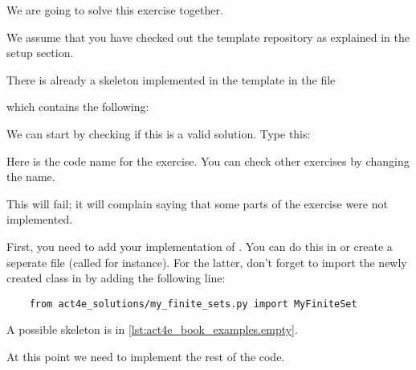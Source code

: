 We are going to solve this exercise together.

We assume that you have checked out the template repository as explained in the setup section.

There is already a skeleton implemented in the template in the file


which contains the following:

\begin{longcode}
    \caption{}

    \label{lst:act4e_book_examples.initial}
\end{longcode}

We can start by checking if this is a valid solution.
Type this:


Here  is the code name for the exercise.
You can check other exercises by changing the name.

This will fail; it will complain saying that some parts of the exercise were not implemented.


First, you need to add your implementation of .
You can do this in  or create a seperate file (called  for instance).
For the latter, don't forget to import the newly created class in  by adding the following line:
\begin{verbatim}
    from act4e_solutions/my_finite_sets.py import MyFiniteSet
\end{verbatim}
A possible skeleton is in \cref{lst:act4e_book_examples.empty}.

\begin{longcode}
    \caption{}

    \label{lst:act4e_book_examples.empty}
\end{longcode}

At this point we need to implement the rest of the code.

